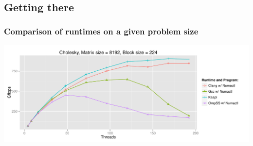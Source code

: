 \documentclass[xcolor={usenames,dvipsnames,svgnames,table}, aspectratio=43]{beamer}
\begin{document}







\subsection{Getting there}

\begin{frame}
  \frametitle{Comparison of runtimes on a given problem size}
  \begin{center}
    \includegraphics[width=\textwidth]{graph/dpotrf_scale_8k.pdf}
  \end{center}
\end{frame}
\end{document}
